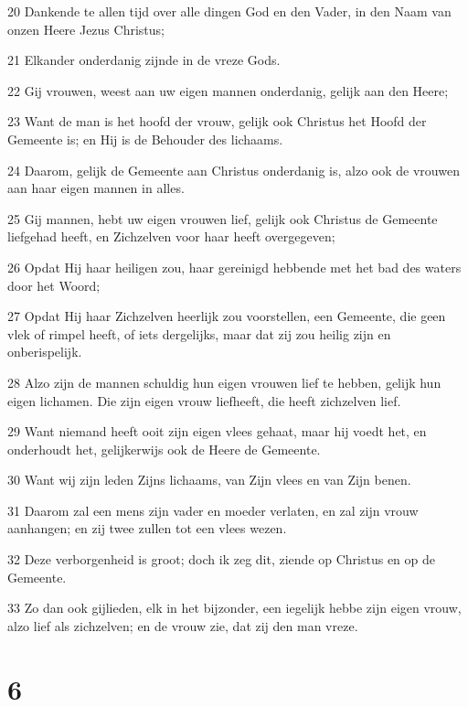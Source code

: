 \par 20 Dankende te allen tijd over alle dingen God en den Vader, in den Naam van onzen Heere Jezus Christus;
\par 21 Elkander onderdanig zijnde in de vreze Gods.
\par 22 Gij vrouwen, weest aan uw eigen mannen onderdanig, gelijk aan den Heere;
\par 23 Want de man is het hoofd der vrouw, gelijk ook Christus het Hoofd der Gemeente is; en Hij is de Behouder des lichaams.
\par 24 Daarom, gelijk de Gemeente aan Christus onderdanig is, alzo ook de vrouwen aan haar eigen mannen in alles.
\par 25 Gij mannen, hebt uw eigen vrouwen lief, gelijk ook Christus de Gemeente liefgehad heeft, en Zichzelven voor haar heeft overgegeven;
\par 26 Opdat Hij haar heiligen zou, haar gereinigd hebbende met het bad des waters door het Woord;
\par 27 Opdat Hij haar Zichzelven heerlijk zou voorstellen, een Gemeente, die geen vlek of rimpel heeft, of iets dergelijks, maar dat zij zou heilig zijn en onberispelijk.
\par 28 Alzo zijn de mannen schuldig hun eigen vrouwen lief te hebben, gelijk hun eigen lichamen. Die zijn eigen vrouw liefheeft, die heeft zichzelven lief.
\par 29 Want niemand heeft ooit zijn eigen vlees gehaat, maar hij voedt het, en onderhoudt het, gelijkerwijs ook de Heere de Gemeente.
\par 30 Want wij zijn leden Zijns lichaams, van Zijn vlees en van Zijn benen.
\par 31 Daarom zal een mens zijn vader en moeder verlaten, en zal zijn vrouw aanhangen; en zij twee zullen tot een vlees wezen.
\par 32 Deze verborgenheid is groot; doch ik zeg dit, ziende op Christus en op de Gemeente.
\par 33 Zo dan ook gijlieden, elk in het bijzonder, een iegelijk hebbe zijn eigen vrouw, alzo lief als zichzelven; en de vrouw zie, dat zij den man vreze.

\chapter{6}

